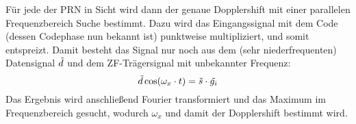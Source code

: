 Für jede der PRN in Sicht wird dann der genaue Dopplershift mit einer parallelen Frequenzbereich Suche bestimmt. Dazu wird das Eingangssignal mit dem Code (dessen Codephase nun bekannt ist) punktweise multipliziert, und somit entspreizt. Damit besteht das Signal nur noch aus dem (sehr niederfrequenten) Datensignal $\tilde{d}$ und dem ZF-Trägersignal mit unbekannter Frequenz:
\begin{equation}
	\tilde{d} \cos(\omega_x \cdot t) = \tilde{s} \cdot \tilde{g_i}
\end{equation}
Das Ergebnis wird anschließend Fourier transformiert und das Maximum im Frequenzbereich gesucht, wodurch $\omega_x$ und damit der Dopplershift bestimmt wird.

